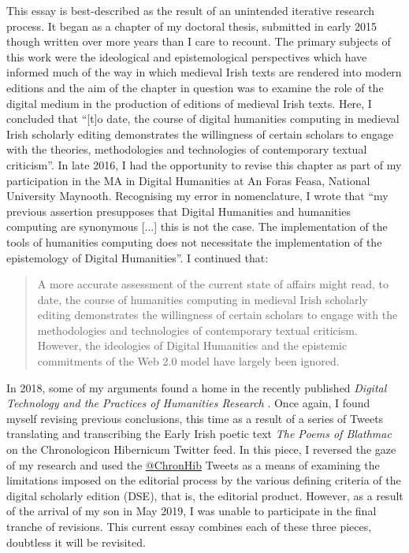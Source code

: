 \begin{paper}
\linespread{1.15}This essay is best-described as the result of an unintended iterative research process. It began as a chapter of my doctoral thesis, submitted in early 2015 though written over more years than I care to recount. The primary subjects of this work were the ideological and epistemological perspectives which have informed much of the way in which medieval Irish texts are rendered into modern editions and the aim of the chapter in question was to examine the role of the digital medium in the production of editions of medieval Irish texts. Here, I concluded that ``[t]o date, the course of digital humanities computing in medieval Irish scholarly editing demonstrates the willingness of certain scholars to engage with the theories, methodologies and technologies of contemporary textual criticism''\citep[337]{doran_text_2015}. In late 2016, I had the opportunity to revise this chapter as part of my participation in the MA in Digital Humanities at An Foras Feasa, National University Maynooth. Recognising my error in nomenclature, I wrote that ``my previous assertion presupposes that Digital Humanities and humanities computing are synonymous [...] this is not the case. The implementation of the tools of humanities computing does not necessitate the implementation of the epistemology of Digital Humanities''. I continued that: 

\begin{quote}
A more accurate assessment of the current state of affairs might read, to date, the course of humanities computing in medieval Irish scholarly editing demonstrates the willingness of certain scholars to engage with the methodologies and technologies of contemporary textual criticism.  However, the ideologies of Digital Humanities and the epistemic commitments of the Web 2.0 model have largely been ignored.
\begin{flushright}
\citep{doran_reflections_2016}
\end{flushright}
\end{quote}

\noindent In 2018, some of my arguments found a home in the recently published \emph{Digital Technology and the Practices of Humanities Research} \citep{edmond_digital_2020}. Once again, I found myself revising previous conclusions, this time as a result of a series of Tweets translating and transcribing the Early Irish poetic text \emph{The Poems of Blathmac} on the Chronologicon Hibernicum Twitter feed. In this piece, I reversed the gaze of my research and used the \href{https://twitter.com/chronhib}{@ChronHib} Tweets as a means of examining the limitations imposed on the editorial process by the various defining criteria of the digital scholarly edition (DSE), that is, the editorial product. However, as a result of the arrival of my son in May 2019, I was unable to participate in the final tranche of revisions. This current essay combines each of these three pieces, doubtless it will be revisited.


\end{paper}
